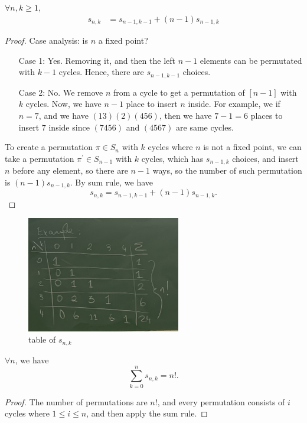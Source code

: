 \begin{proposition} \label{prop: recurtsion for first kind striling num}
    \(\forall n, k \ge 1\), 
    \begin{align*}
        s_{n,k} &= s_{n-1, k-1} + (n-1)s_{n-1,k}
    \end{align*} 
\end{proposition}
\begin{proof}
    Case analysis: is \(n\) a fixed point? 
    \begin{itemize}
        \item [Case 1:] Yes. Removing it, and then the left \(n-1\) elements can be permutated with \(k-1\) cycles. Hence, there are \(s_{n-1,k-1}\) choices.  
        \item [Case 2:] No. We remove \(n\) from a cycle to get a permutation of \([n-1]\) with \(k\) cycles. Now, we have \(n-1\) place to insert \(n\) inside. For example, we if \(n=7\), and we have \((13)(2)(456)\), then we have \(7-1=6\) places to insert \(7\) inside since \((7456)\) and \((4567)\) are same cycles.         
    \end{itemize} 
    To create a permutation \(\pi \in S_n\) with \(k\) cycles where \(n\) is not a fixed point, we can take a permutation \(\pi ^{\prime}  \in S_{n-1}\) with \(k\) cycles, which has \(s_{n-1, k}\) choices, and insert \(n\) before any element, so there are \(n-1\) ways, so the number of such permutation is \((n-1)s_{n-1,k}\).  By sum rule, we have 
    \[
        s_{n, k} = s_{n-1, k-1} + (n-1)s_{n-1, k}.
    \]
\end{proof}    
\begin{figure}[H]
    \centering
    \includegraphics[width=0.6\textwidth]{./Figures/IMG_3936.jpg}
    \caption{table of \(s_{n,k}\)}
    \label{fig:table of Stirling number of first kind}
\end{figure}

\begin{corollary}
    \(\forall n\), we have 
    \[
        \sum_{k=0}^n s_{n,k} = n!. 
    \] 
\end{corollary}
\begin{proof}
    The number of permutations are \(n!\), and every permutation consists of \(i\) cycles where \(1 \le i \le n\), and then apply the sum rule.   
\end{proof}


